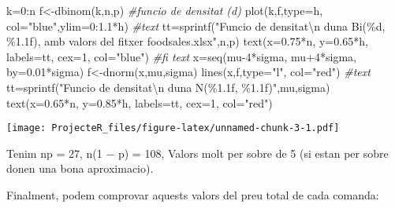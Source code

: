 \documentclass[
]{article}
\newenvironment{Shaded}{\begin{snugshade}}{\end{snugshade}}
\newcommand{\AttributeTok}[1]{\textcolor[rgb]{0.77,0.63,0.00}{#1}}
\newcommand{\CommentTok}[1]{\textcolor[rgb]{0.56,0.35,0.01}{\textit{#1}}}
\newcommand{\DecValTok}[1]{\textcolor[rgb]{0.00,0.00,0.81}{#1}}
\newcommand{\FloatTok}[1]{\textcolor[rgb]{0.00,0.00,0.81}{#1}}
\newcommand{\FunctionTok}[1]{\textcolor[rgb]{0.00,0.00,0.00}{#1}}
\newcommand{\NormalTok}[1]{#1}
\newcommand{\OtherTok}[1]{\textcolor[rgb]{0.56,0.35,0.01}{#1}}
\newcommand{\SpecialCharTok}[1]{\textcolor[rgb]{0.00,0.00,0.00}{#1}}
\newcommand{\StringTok}[1]{\textcolor[rgb]{0.31,0.60,0.02}{#1}}
\begin{document}
\begin{Shaded}
\begin{Highlighting}[]
\NormalTok{k}\OtherTok{=}\DecValTok{0}\SpecialCharTok{:}\NormalTok{n}
\NormalTok{f}\OtherTok{\textless{}{-}}\FunctionTok{dbinom}\NormalTok{(k,n,p) }\CommentTok{\#funcio de densitat (d)}
\FunctionTok{plot}\NormalTok{(k,f,}\AttributeTok{type=}\StringTok{\textquotesingle{}h\textquotesingle{}}\NormalTok{, }\AttributeTok{col=}\StringTok{"blue"}\NormalTok{,}\AttributeTok{ylim=}\DecValTok{0}\SpecialCharTok{:}\FloatTok{1.1}\SpecialCharTok{*}\NormalTok{h)}
\CommentTok{\#text}
\NormalTok{tt}\OtherTok{=}\FunctionTok{sprintf}\NormalTok{(}\StringTok{"Funcio de densitat}\SpecialCharTok{\textbackslash{}n}\StringTok{ d\textquotesingle{}una Bi(\%d, \%1.1f), amb valors del fitxer \textquotesingle{}foodsales.xlsx\textquotesingle{}"}\NormalTok{,n,p)}
\FunctionTok{text}\NormalTok{(}\AttributeTok{x=}\FloatTok{0.75}\SpecialCharTok{*}\NormalTok{n, }\AttributeTok{y=}\FloatTok{0.65}\SpecialCharTok{*}\NormalTok{h, }\AttributeTok{labels=}\NormalTok{tt, }\AttributeTok{cex=}\DecValTok{1}\NormalTok{, }\AttributeTok{col=}\StringTok{"blue"}\NormalTok{)}
\CommentTok{\#fi text}
\NormalTok{x}\OtherTok{=}\FunctionTok{seq}\NormalTok{(mu}\DecValTok{{-}4}\SpecialCharTok{*}\NormalTok{sigma, mu}\SpecialCharTok{+}\DecValTok{4}\SpecialCharTok{*}\NormalTok{sigma, }\AttributeTok{by=}\FloatTok{0.01}\SpecialCharTok{*}\NormalTok{sigma)}
\NormalTok{f}\OtherTok{\textless{}{-}}\FunctionTok{dnorm}\NormalTok{(x,mu,sigma)}
\FunctionTok{lines}\NormalTok{(x,f,}\AttributeTok{type=}\StringTok{"l"}\NormalTok{, }\AttributeTok{col=}\StringTok{"red"}\NormalTok{)}
\CommentTok{\#text}
\NormalTok{tt}\OtherTok{=}\FunctionTok{sprintf}\NormalTok{(}\StringTok{"Funcio de densitat}\SpecialCharTok{\textbackslash{}n}\StringTok{ d\textquotesingle{}una N(\%1.1f, \%1.1f)"}\NormalTok{,mu,sigma)}
\FunctionTok{text}\NormalTok{(}\AttributeTok{x=}\FloatTok{0.65}\SpecialCharTok{*}\NormalTok{n, }\AttributeTok{y=}\FloatTok{0.85}\SpecialCharTok{*}\NormalTok{h, }\AttributeTok{labels=}\NormalTok{tt, }\AttributeTok{cex=}\DecValTok{1}\NormalTok{, }\AttributeTok{col=}\StringTok{"red"}\NormalTok{)}
\end{Highlighting}
\end{Shaded}

\texttt{[image: ProjecteR\_files/figure-latex/unnamed-chunk-3-1.pdf]}

Tenim np = 27, n(1 − p) = 108, Valors molt per sobre de 5 (si estan per
sobre donen una bona aproximacio).

Finalment, podem comprovar aquests valors del preu total de cada
comanda:
\end{document}
